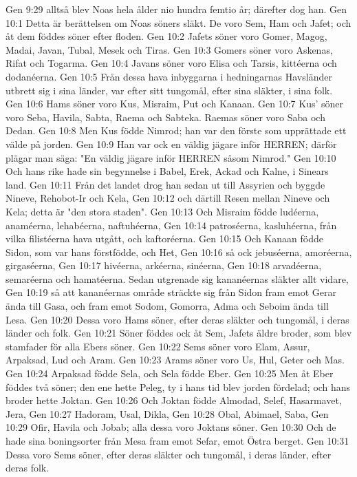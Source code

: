 Gen 9:29  alltså blev Noas hela ålder nio hundra femtio år; därefter dog han.
Gen 10:1  Detta är berättelsen om Noas söners släkt. De voro Sem, Ham och Jafet; och åt dem föddes söner efter floden.
Gen 10:2  Jafets söner voro Gomer, Magog, Madai, Javan, Tubal, Mesek och Tiras.
Gen 10:3  Gomers söner voro Askenas, Rifat och Togarma.
Gen 10:4  Javans söner voro Elisa och Tarsis, kittéerna och dodanéerna.
Gen 10:5  Från dessa hava inbyggarna i hedningarnas Havsländer utbrett sig i sina länder, var efter sitt tungomål, efter sina släkter, i sina folk.
Gen 10:6  Hams söner voro Kus, Misraim, Put och Kanaan.
Gen 10:7  Kus' söner voro Seba, Havila, Sabta, Raema och Sabteka. Raemas söner voro Saba och Dedan.
Gen 10:8  Men Kus födde Nimrod; han var den förste som upprättade ett välde på jorden.
Gen 10:9  Han var ock en väldig jägare inför HERREN; därför plägar man säga: "En väldig jägare inför HERREN såsom Nimrod."
Gen 10:10  Och hans rike hade sin begynnelse i Babel, Erek, Ackad och Kalne, i Sinears land.
Gen 10:11  Från det landet drog han sedan ut till Assyrien och byggde Nineve, Rehobot-Ir och Kela,
Gen 10:12  och därtill Resen mellan Nineve och Kela; detta är "den stora staden".
Gen 10:13  Och Misraim födde ludéerna, anaméerna, lehabéerna, naftuhéerna,
Gen 10:14  patroséerna, kasluhéerna, från vilka filistéerna hava utgått, och kaftoréerna.
Gen 10:15  Och Kanaan födde Sidon, som var hans förstfödde, och Het,
Gen 10:16  så ock jebuséerna, amoréerna, girgaséerna,
Gen 10:17  hivéerna, arkéerna, sinéerna,
Gen 10:18  arvadéerna, semaréerna och hamatéerna. Sedan utgrenade sig kananéernas släkter allt vidare,
Gen 10:19  så att kananéernas område sträckte sig från Sidon fram emot Gerar ända till Gasa, och fram emot Sodom, Gomorra, Adma och Seboim ända till Lesa.
Gen 10:20  Dessa voro Hams söner, efter deras släkter och tungomål, i deras länder och folk.
Gen 10:21  Söner föddes ock åt Sem, Jafets äldre broder, som blev stamfader för alla Ebers söner.
Gen 10:22  Sems söner voro Elam, Assur, Arpaksad, Lud och Aram.
Gen 10:23  Arams söner voro Us, Hul, Geter och Mas.
Gen 10:24  Arpaksad födde Sela, och Sela födde Eber.
Gen 10:25  Men åt Eber föddes två söner; den ene hette Peleg, ty i hans tid blev jorden fördelad; och hans broder hette Joktan.
Gen 10:26  Och Joktan födde Almodad, Selef, Hasarmavet, Jera,
Gen 10:27  Hadoram, Usal, Dikla,
Gen 10:28  Obal, Abimael, Saba,
Gen 10:29  Ofir, Havila och Jobab; alla dessa voro Joktans söner.
Gen 10:30  Och de hade sina boningsorter från Mesa fram emot Sefar, emot Östra berget.
Gen 10:31  Dessa voro Sems söner, efter deras släkter och tungomål, i deras länder, efter deras folk.
